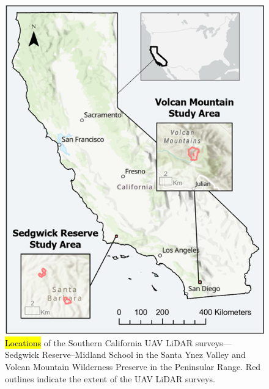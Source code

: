 \documentclass[remotesensing,article,accept,pdftex,moreauthors]{Definitions/mdpi}
\begin{document}
\begin{figure}[H]
  \includegraphics[width=0.75\linewidth]{figures/Overall_Study_Areas_v2.png}
    \caption{\hl{Locations} %
 of the Southern California UAV LiDAR surveys—Sedgwick Reserve–Midland School in the Santa Ynez Valley and Volcan Mountain Wilderness Preserve in the Peninsular Range. Red outlines indicate the extent of the UAV LiDAR surveys.}
  \label{fig:overall_study_area}
\end{figure}
\vspace{-9pt}
\end{document}
